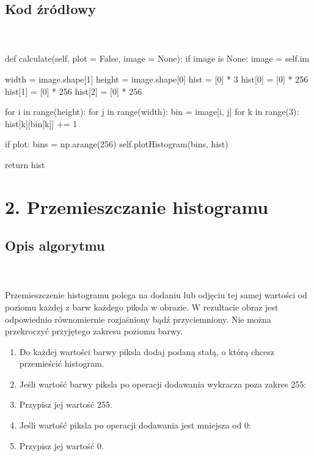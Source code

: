 \documentclass[final,a4paper,openany,12pt]{mwbk}
\begin{document}
\subsection*{Kod źródłowy}
\hfill
\\\\
\noindent def calculate(self, plot = False, image = None): \newline
\indent if image is None: \newline
\indent image = self.im \newline

width = image.shape[1] \newline
\indent height = image.shape[0] \newline
\indent hist = [0] * 3 \newline
\indent hist[0] = [0] * 256 \newline
\indent hist[1] = [0] * 256 \newline
\indent hist[2] = [0] * 256 \newline

for i in range(height): \newline
\indent for j in range(width): \newline
\indent bin = image[i, j] \newline
\indent for k in range(3): \newline
\indent hist[k][bin[k]] += 1 \newline

if plot: \newline
\indent bins = np.arange(256) \newline
\indent self.plotHistogram(bins, hist) \newline

return hist \newline
\pagebreak


\section*{2. Przemieszczanie histogramu}
\subsection*{Opis algorytmu}
\hfill
\\\\
\indent Przemieszczenie histogramu polega na dodaniu lub odjęciu tej samej wartości od poziomu każdej z barw każdego piksla w obrazie.
W rezultacie obraz jest odpowiednio równomiernie rozjaśniony bądź przyciemniony.
Nie można przekroczyć przyjętego zakresu poziomu barwy.
\begin{enumerate}
	\item Do każdej wartości barwy piksla dodaj podaną stałą, o którą chcesz przemieścić histogram.
	\item Jeśli wartość barwy piksla po operacji dodawania wykracza poza zakres 255:
	\item Przypisz jej wartość 255.
	\item Jeśli wartość piksla po operacji dodawania jest mniejsza od 0:
	\item Przypisz jej wartość 0.
\end{enumerate}
\end{document}
